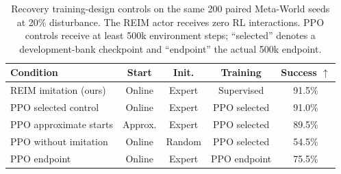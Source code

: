 \begin{table}[t]
  \centering
  \caption{Recovery training-design controls on the same 200 paired
  Meta-World seeds at 20\% disturbance. The REIM actor receives zero RL
  interactions. PPO controls receive at least 500k environment steps;
  ``selected'' denotes a development-bank checkpoint and ``endpoint'' the
  actual 500k endpoint.}
  \label{tab:training-design}
  \scriptsize
  \setlength{\tabcolsep}{3.2pt}
  \begin{tabular}{lcccc}
    \toprule
    Condition & Start & Init. & Training & Success $\uparrow$ \\
    \midrule
    REIM imitation (ours) & Online & Expert & Supervised & 91.5\% \\
    PPO selected control & Online & Expert & PPO selected & 91.0\% \\
    PPO approximate starts & Approx. & Expert & PPO selected & 89.5\% \\
    PPO without imitation & Online & Random & PPO selected & 54.5\% \\
    PPO endpoint & Online & Expert & PPO endpoint & 75.5\% \\
    \bottomrule
  \end{tabular}
\end{table}
